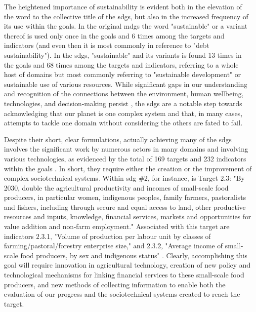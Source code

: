 The heightened importance of sustainability is evident both in the elevation of the word to the collective title of the \acp{sdg}, but also in the increased frequency of its use within the goals. In the original \acp{mdg} the word "sustainable" or a variant thereof is used only once in the goals and 6 times among the targets and indicators (and even then it is most commonly in reference to "debt sustainability"). In the \acp{sdg}, "sustainable" and its variants is found 13 times in the goals and 68 times among the targets and indicators, referring to a whole host of domains but most commonly referring to "sustainable development" or sustainable use of various resources. While significant gaps in our understanding and recognition of the connections between the environment, human wellbeing, technologies, and decision-making persist \cite{bennichDecipheringScientificLiterature2020}, the \acp{sdg} are a notable step towards acknowledging that our planet is one complex system and that, in many cases, attempts to tackle one domain without considering the others are fated to fail. 

Despite their short, clear formulations, actually achieving many of the \acp{sdg} involves the significant work by numerous actors in many domains and involving various technologies, as evidenced by the total of 169 targets and  232 indicators within the goals \cite{unitednationsgeneralassemblyGlobalIndicatorFramework2017}. In short, they require either the creation or the improvement of complex sociotechnical systems. Within \ac{sdg} \#2, for instance, is Target 2.3: "By 2030, double the agricultural productivity and incomes of small-scale food producers, in particular women, indigenous peoples, family farmers, pastoralists and fishers, including through secure and equal access to land, other productive resources and inputs, knowledge, financial services, markets and opportunities for value addition and non-farm employment." Associated with this target are indicators 2.3.1, "Volume of production per labour unit by classes of farming/pastoral/forestry enterprise size," and 2.3.2, "Average income of small-scale food producers, by sex and indigenous status" \cite{unitednationsgeneralassemblyGlobalIndicatorFramework2017}. Clearly, accomplishing this goal will require innovation in agricultural technology, creation of new policy and technological mechanisms for linking financial services to these small-scale food producers, and new methods of collecting information to enable both the evaluation of our progress and the sociotechnical systems created to reach the target. 



